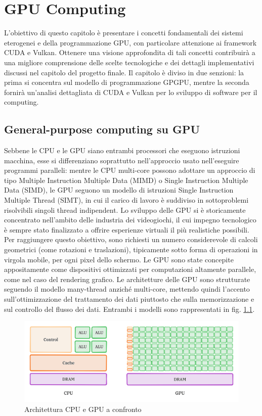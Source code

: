 \chapter{GPU Computing}
\label{sec:gpu}


L'obiettivo di questo capitolo è presentare i concetti fondamentali dei sistemi eterogenei e della programmazione GPU, con particolare attenzione ai framework CUDA e Vulkan. Ottenere una visione approfondita di tali concetti contribuirà a una migliore comprensione delle scelte tecnologiche e dei dettagli implementativi discussi nel capitolo del progetto finale. Il capitolo è diviso in due senzioni: la prima si concentra sul modello di programmazione GPGPU, mentre la seconda fornirà un'analisi dettagliata di CUDA e Vulkan per lo sviluppo di software per il computing.

\section[General-purpose computing su GPU]{General-purpose computing su GPU}

Sebbene le CPU e le GPU siano entrambi processori che eseguono istruzioni macchina, esse si differenziano soprattutto nell'approccio usato nell'eseguire programmi paralleli: mentre le CPU multi-core possono adottare un approccio di tipo Multiple Instruction Multiple Data (MIMD) o Single Instruction Multiple Data (SIMD), le GPU seguono un modello di istruzioni Single Instruction Multiple Thread (SIMT), in cui il carico di lavoro è suddiviso in sottoproblemi risolvibili singoli thread indipendent. Lo sviluppo delle GPU si è storicamente concentrato nell'ambito delle industria dei videogiochi, il cui impegno tecnologico è sempre stato finalizzato a offrire esperienze virtuali il più realistiche possibili. Per raggiungere questo obiettivo, sono richiesti un numero considerevole di calcoli geometrici (come rotazioni e traslazioni), tipicamente sotto forma di operazioni in virgola mobile, per ogni pixel dello schermo. Le GPU sono state concepite appositamente come dispositivi ottimizzati per computazioni altamente parallele, come nel caso del rendering grafico. Le architetture delle GPU sono strutturate seguendo il modello many-thread anziché multi-core, mettendo quindi l'accento sull'ottimizzazione del trattamento dei dati piuttosto che sulla memorizzazione e sul controllo del flusso dei dati.
Entrambi i modelli sono rappresentati in fig. \ref{fig:cpu_vs_gpu}.

\begin{figure}[ht]
    \centering
    \includegraphics[width=.9\linewidth]{images/chapter2/cpu_vs_gpu.png}
    \caption{Architettura CPU e GPU a confronto}
    \label{fig:cpu_vs_gpu}
\end{figure}

